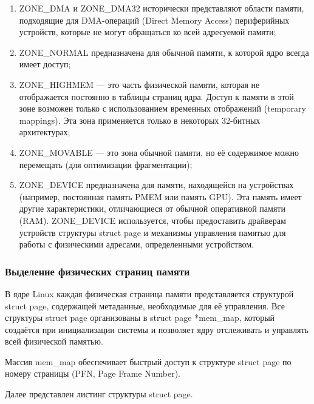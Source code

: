 \begin{enumerate}
    \item ZONE\_DMA и ZONE\_DMA32 исторически представляют области памяти, подходящие для DMA-операций (Direct Memory Access) периферийных устройств, которые не могут обращаться ко всей адресуемой памяти;
    \item ZONE\_NORMAL предназначена для обычной памяти, к которой ядро всегда имеет доступ;
    \item ZONE\_HIGHMEM --- это часть физической памяти, которая не отображается постоянно в таблицы страниц ядра. Доступ к памяти в этой зоне возможен только с использованием временных отображений (temporary mappings). Эта зона применяется только в некоторых 32-битных архитектурах;
    \item ZONE\_MOVABLE --- это зона обычной памяти, но её содержимое можно перемещать (для оптимизации фрагментации);
    \item ZONE\_DEVICE предназначена для памяти, находящейся на устройствах (например, постоянная память PMEM или память GPU). Эта память имеет другие характеристики, отличающиеся от обычной оперативной памяти (RAM). ZONE\_DEVICE используется, чтобы предоставить драйверам устройств структуры {struct page} и механизмы управления памятью для работы с физическими адресами, определенными устройством.~\cite{mem}
\end{enumerate}

\subsubsection{Выделение физических страниц памяти}

В ядре Linux каждая физическая страница памяти представляется структурой {struct page}, содержащей метаданные, необходимые для её управления.
Все структуры {struct page} организованы в {struct page *mem\_map}, который создаётся при инициализации системы и позволяет ядру отслеживать и управлять всей физической памятью.

Массив mem\_map обеспечивает быстрый доступ к структуре {struct page} по номеру страницы (PFN, Page Frame Number).

Далее представлен листинг структуры {struct page}.

